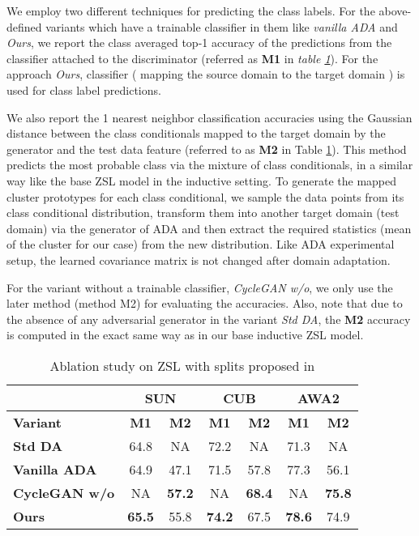 \documentclass[10pt,twocolumn,letterpaper]{article}
\begin{document}
We employ two different techniques for predicting the class labels. For the above-defined variants which have a trainable classifier in them like \textit{vanilla ADA} and \textit{Ours}, we report the class averaged top-1 accuracy of the predictions from the classifier attached to the discriminator (referred as \textbf{M1} in \textit{table \ref{tab:ablationzsl}}). For the approach \textit{Ours}, classifier  ( mapping the source domain to the target domain ) is used for class label predictions.

We also report the 1 nearest neighbor classification accuracies using the Gaussian distance between the class conditionals mapped to the target domain by the generator and the test data feature (referred to as \textbf{M2} in Table \ref{tab:ablationzsl}). This method predicts the most probable class via the mixture of class conditionals, in a similar way like the base ZSL model in the inductive setting. To generate the mapped cluster prototypes for each class conditional, we sample the data points from its class conditional distribution, transform them into another target domain (test domain) via the generator of ADA and then extract the required statistics (mean of the cluster for our case) from the new distribution. Like ADA experimental setup, the learned covariance matrix is not changed after domain adaptation. 

For the variant without a trainable classifier, \textit{CycleGAN w/o}, we only use the later method (method M2)  for evaluating the accuracies. Also, note that due to the absence of any adversarial generator in the variant \textit{Std DA}, the \textbf{M2} accuracy is computed in the exact same way as in our base inductive ZSL model.
\begin{table}[h!]
\scriptsize
 \centering
 \addtolength{\tabcolsep}{0.2pt}
 \begin{tabular}{|l| c | c | c | c | c | c |} 
 \hline
   & \multicolumn{2}{c|}{\textbf{SUN}} & \multicolumn{2}{c|}{\textbf{CUB}} &  \multicolumn{2}{c|}{\textbf{AWA2}} \\
  \hline
  \textbf{Variant} & \textbf{M1}& \textbf{M2}& \textbf{M1} & \textbf{M2} & \textbf{M1} & \textbf{M2} \\
  \hline
\textbf{Std DA}  & 64.8  & NA & 72.2 & NA & 71.3 & NA\\
 \hline
 \textbf{Vanilla ADA}  & 64.9  & 47.1 & 71.5 & 57.8 & 77.3 & 56.1\\
 \hline
 \textbf{CycleGAN w/o}  & NA  &  \textbf{57.2}  & NA & \textbf{68.4} & NA & \textbf{75.8}\\
  \hline
 \textbf{Ours} & \textbf{65.5}  & {55.8} & \textbf{74.2}  & 67.5 & \textbf{78.6} & 74.9\\
 \hline
 \end{tabular}
 \caption{Ablation study on ZSL with splits proposed in \cite{xian2018zero}}
 \label{tab:ablationzsl}
 \vspace{-3.5em}
\end{table}
\end{document}
